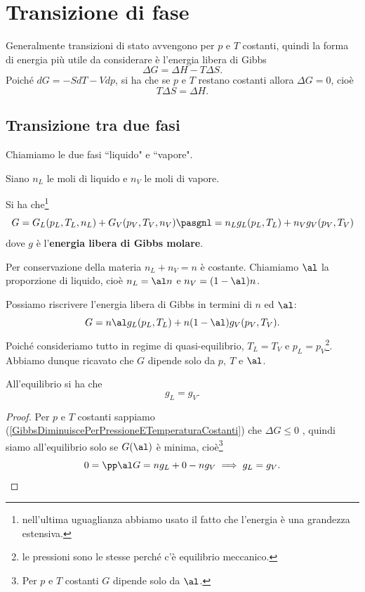 \chapter{Transizione di fase}
Generalmente transizioni di stato avvengono per $p$ e $T$ costanti, quindi la forma di energia pi\`u utile da considerare \`e l'energia libera di Gibbs
\[\Delta G=\Delta H-T\Delta S.\]
Poich\'e $dG=-SdT-Vdp$, si ha che se $p$ e $T$ restano costanti allora $\Delta G=0$, cio\`e \[T\Delta S=\Delta H.\]



\section{Transizione tra due fasi}
Chiamiamo le due fasi ``liquido" e ``vapore". 
\begin{notation}
Siano $n_L$ le moli di liquido e $n_V$ le moli di vapore.
\end{notation}
\begin{remark}
Si ha che\footnote{nell'ultima uguaglianza abbiamo usato il fatto che l'energia \`e una grandezza estensiva.}
\[G=G_L(p_L,T_L,n_L)+G_V(p_V,T_V,n_V)\pasgnl={}n_Lg_L(p_L,T_L)+n_Vg_V(p_V,T_V)\]
dove $g$ \`e l'\textbf{energia libera di Gibbs molare}.
\end{remark}

\begin{remark}
Per conservazione della materia $n_L+n_V=n$ \`e costante. Chiamiamo $\al$ la proporzione di liquido, cio\`e $n_L=\al n$ e $n_V=(1-\al)n$.
\end{remark}
\noindent
Possiamo riscrivere l'energia libera di Gibbs in termini di $n$ ed $\al$:
\[G=n\al g_L(p_L,T_L)+n(1-\al)g_V(p_V,T_V).\]
Poich\'e consideriamo tutto in regime di quasi-equilibrio, $T_L=T_V$ e $p_L=p_V$\footnote{le pressioni sono le stesse perch\'e c'\`e equilibrio meccanico.}. Abbiamo dunque ricavato che $G$ dipende solo da $p,\ T$ e $\al$.

\begin{proposition}
All'equilibrio si ha che
\[g_L=g_V.\]
\end{proposition}
\begin{proof}
Per $p$ e $T$ costanti sappiamo (\ref{GibbsDiminuiscePerPressioneETemperaturaCostanti}) che $\Delta G\leq 0$ , quindi siamo all'equilibrio solo se $G(\al)$ \`e minima, cio\`e\footnote{Per $p$ e $T$ costanti $G$ dipende solo da $\al$.}
\[0=\pp\al G=ng_L+0-n g_V\implies g_L=g_V.\]
\end{proof}

